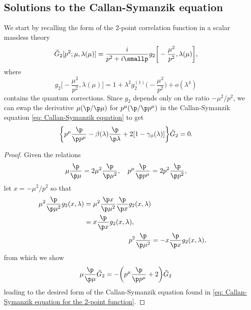 \subsection{Solutions to the Callan-Symanzik equation}
We start by recalling the form of the 2-point correlation function in a scalar massless theory
\begin{equation}
    \tilde{G}_2[p^2;\mu,\lambda(\mu)] = \frac{i}{p^2 + i\smallp}g_2\bigg[-\frac{\mu^2}{p^2},\lambda(\mu)\bigg],
\end{equation}
where
\begin{equation}
    g_2\bigg[-\frac{\mu^2}{p^2},\lambda(\mu)\bigg] = 1 + \lambda^2g_2^{(1)}\bigg(-\frac{\mu^2}{p^2}\bigg) + o(\lambda^4)
\end{equation}
contains the quantum corrections. Since $g_2$ depends only on the ratio $-\mu^2/p^2$, we can swap the derivative $\mu(\p/\p\mu)$ for $p^\mu(\p/\p p^\mu)$ in the Callan-Symanzik equation \eqref{eq: Callan-Symanzik equation} to get
\begin{equation}
\label{eq: Callan-Symanzik equation for the 2-point function}
    \bigg\{p^\mu\frac{\p}{\p p^\mu} - \beta(\lambda)\frac{\p}{\p\lambda} +2[1 - \gamma_\phi(\lambda)]\bigg\}\tilde{G}_2 = 0.
\end{equation}
\begin{proof}
    Given the relations 
    \begin{equation}
        \mu\frac{\p}{\p \mu} = 2\mu^2\frac{\p}{\p \mu^2},\quad p^\mu\frac{\p}{\p p^\mu} = 2p^2\frac{\p}{\p p^2},
    \end{equation}
    let $x = -\mu^2/p^2$ so that
    \begin{align}
        \begin{split}
            \mu^2\frac{\p}{\p \mu^2}g_2(x,\lambda) &= \mu^2\frac{\p x}{\p\mu^2}\frac{\p}{\p x}g_2(x,\lambda) \\
            &= x\frac{\p}{\p x}g_2(x,\lambda),
        \end{split} \\
        p^2\frac{\p}{\p \mu^2} &= -x\frac{\p}{\p x}g_2(x,\lambda),
    \end{align}
from which we show 
\begin{equation}
    \mu\frac{\p}{\p \mu}\tilde{G}_2 = -\bigg(p^\mu\frac{\p}{\p p^\mu} + 2\bigg)\tilde{G}_2
\end{equation}
leading to the desired form of the Callan-Symanzik equation found in \eqref{eq: Callan-Symanzik equation for the 2-point function}. 
\end{proof}

